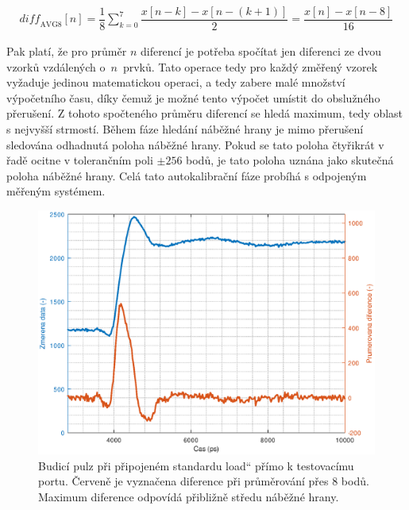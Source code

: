 \begin{equation}
\begin{gathered}
	\mathit{diff}_{\mathrm{AVG8}}[n]= \dfrac{1}{8} \sum_{k=0}^7 \dfrac{x[n-k]-x[n-(k+1)]}{2}= \dfrac{x[n]-x[n-8]}{16}
\end{gathered}
\label{equation_difference_sum}
\end{equation}

Pak platí, že pro průměr $n$ diferencí je potřeba spočítat jen diferenci ze dvou vzorků vzdálených o~$n$~prvků. Tato operace tedy pro každý změřený vzorek vyžaduje jedinou matematickou operaci, a tedy zabere malé množství výpočetního času, díky čemuž je možné tento výpočet umístit do obslužného přerušení. Z tohoto spočteného průměru diferencí se hledá maximum, tedy oblast s nejvyšší strmostí. Během fáze hledání náběžné hrany je mimo přerušení sledována odhadnutá poloha náběžné hrany. Pokud se tato poloha čtyřikrát v řadě ocitne v tolerančním poli $\pm256$ bodů, je tato poloha uznána jako skutečná poloha náběžné hrany. Celá tato autokalibrační fáze probíhá s odpojeným měřeným systémem.

\begin{figure}[H]
\includegraphics[width=\textwidth,keepaspectratio]{images/rising_edge_port_load.eps}\caption{Budicí pulz při připojeném standardu \quotedblbase load\textquotedblleft{} přímo k testovacímu portu. Červeně je vyznačena diference při průměrování přes 8 bodů. Maximum diference odpovídá přibližně středu náběžné hrany.}\label{rising_edge_port_load}
\end{figure}

